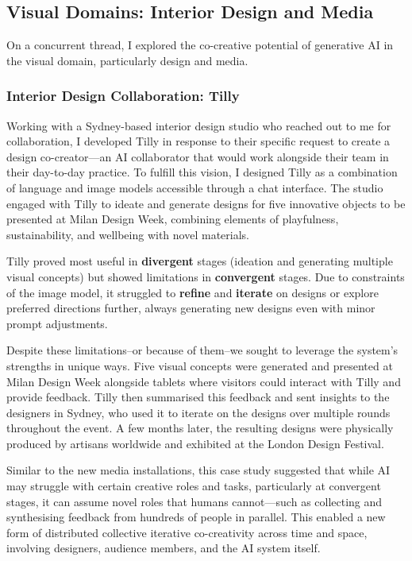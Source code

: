 \subsection{Visual Domains: Interior Design and Media}

On a concurrent thread, I explored the co-creative potential of generative AI in the visual domain, particularly design and media. 

\subsubsection{Interior Design Collaboration: Tilly}

Working with a Sydney-based interior design studio who reached out to me for collaboration, I developed Tilly in response to their specific request to create a design co-creator—an AI collaborator that would work alongside their team in their day-to-day practice. To fulfill this vision, I designed Tilly as a combination of language and image models accessible through a chat interface. The studio engaged with Tilly to ideate and generate designs for five innovative objects to be presented at Milan Design Week, combining elements of playfulness, sustainability, and wellbeing with novel materials.

Tilly proved most useful in \textbf{divergent} stages (ideation and generating multiple visual concepts) but showed limitations in \textbf{convergent} stages. Due to constraints of the image model, it struggled to \textbf{refine} and \textbf{iterate} on designs or explore preferred directions further, always generating new designs even with minor prompt adjustments.

Despite these limitations--or because of them--we sought to leverage the system's strengths in unique ways. Five visual concepts were generated and presented at Milan Design Week alongside tablets where visitors could interact with Tilly and provide feedback. Tilly then summarised this feedback and sent insights to the designers in Sydney, who used it to iterate on the designs over multiple rounds throughout the event. A few months later, the resulting designs were physically produced by artisans worldwide and exhibited at the London Design Festival.

Similar to the new media installations, this case study suggested that while AI may struggle with certain creative roles and tasks, particularly at convergent stages, it can assume novel roles that humans cannot—such as collecting and synthesising feedback from hundreds of people in parallel. This enabled a new form of distributed collective iterative co-creativity across time and space, involving designers, audience members, and the AI system itself.

